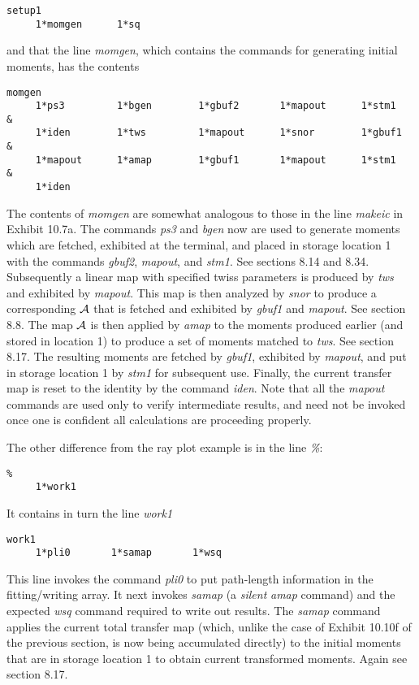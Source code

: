 \begin{footnotesize}
\begin{verbatim}
setup1
     1*momgen      1*sq
\end{verbatim}
\end{footnotesize}
and that the line {\em momgen}, which contains the commands for
generating initial moments, has the contents

\begin{footnotesize}
\begin{verbatim}
momgen
     1*ps3         1*bgen        1*gbuf2       1*mapout      1*stm1     &
     1*iden        1*tws         1*mapout      1*snor        1*gbuf1    &
     1*mapout      1*amap        1*gbuf1       1*mapout      1*stm1     &
     1*iden
\end{verbatim}
\end{footnotesize}
The contents of {\em momgen} are somewhat analogous to those in the line
{\em makeic} in Exhibit 10.7a.  The commands {\em ps3} and {\em bgen} now
are used to generate moments which are fetched, exhibited at the terminal, and placed in
storage location 1 with the commands {\em gbuf2}, {\em mapout}, and {\em
stm1}.  See sections 8.14 and 8.34.  Subsequently a linear map with specified twiss
parameters is produced by {\em tws} and exhibited by {\em mapout}.  This
map is then analyzed by {\em snor} to produce a corresponding ${\cal A}$
that is fetched and exhibited by {\em gbuf1} and {\em mapout}.  See
section 8.8.  The map ${\cal A}$ is then applied by {\em amap} to the
moments produced earlier (and stored in location 1) to produce a set of
moments matched to {\em tws}.  See section 8.17.  The resulting moments are fetched by {\em
gbuf1}, exhibited by {\em mapout}, and put in storage location 1 by {\em stm1}
for subsequent use.  Finally, the current transfer map is reset to the
identity by the command {\em iden}.  Note that all the {\em mapout}
commands are used only to verify intermediate results, and need not be
invoked once one is confident all calculations are proceeding properly.

The other difference from the ray plot example is in the line {\em \%}:

\begin{footnotesize}
\begin{verbatim}
%
     1*work1
\end{verbatim}
\end{footnotesize}
It contains in turn the line {\em work1}
\begin{footnotesize}
\begin{verbatim}
work1
     1*pli0       1*samap       1*wsq
\end{verbatim}
\end{footnotesize}
This line invokes the command {\em pli0} to put path-length information
in the fitting/writing array.  It next invokes {\em samap} (a {\em silent} {\em amap} command) and the
expected {\em wsq} command required to write out results.  The {\em
samap} command applies the current total transfer map (which, unlike the
case of Exhibit 10.10f of the previous section, is now
being accumulated directly) to the initial moments that are in storage location 1
to obtain current transformed moments.  Again see section 8.17.

